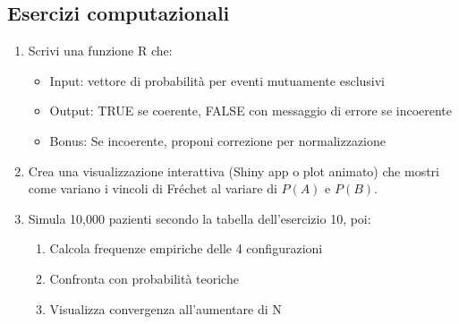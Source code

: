 \documentclass[
  letterpaper,
  DIV=11,
  numbers=noendperiod,
  oneside]{scrreprt}
\providecommand{\tightlist}{%
  \setlength{\itemsep}{0pt}\setlength{\parskip}{0pt}}
\theoremstyle{definition}
\theoremstyle{plain}
\theoremstyle{definition}
\theoremstyle{remark}
\begin{document}
\begin{tcolorbox}
\subsection{Esercizi computazionali}\label{esercizi-computazionali}

\begin{enumerate}
\def\labelenumi{\arabic{enumi}.}
\setcounter{enumi}{15}
\item
  Scrivi una funzione R che:

  \begin{itemize}
  \tightlist
  \item
    Input: vettore di probabilità per eventi mutuamente esclusivi
  \item
    Output: TRUE se coerente, FALSE con messaggio di errore se
    incoerente
  \item
    Bonus: Se incoerente, proponi correzione per normalizzazione
  \end{itemize}
\item
  Crea una visualizzazione interattiva (Shiny app o plot animato) che
  mostri come variano i vincoli di Fréchet al variare di \(P(A)\) e
  \(P(B)\).
\item
  Simula 10,000 pazienti secondo la tabella dell'esercizio 10, poi:

  \begin{enumerate}
  \def\labelenumii{\alph{enumii}.}
  \tightlist
  \item
    Calcola frequenze empiriche delle 4 configurazioni
  \item
    Confronta con probabilità teoriche
  \item
    Visualizza convergenza all'aumentare di N
  \end{enumerate}
\end{enumerate}

\end{tcolorbox}
\end{document}
